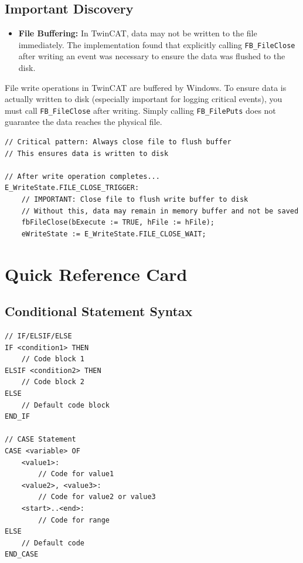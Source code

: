 \documentclass[11pt,a4paper]{article}
\begin{document}
\subsection{Important Discovery}

\begin{itemize}[leftmargin=*]
    \item \textbf{File Buffering:} In TwinCAT, data may not be written to the file immediately. The implementation found that explicitly calling \texttt{FB\_FileClose} after writing an event was necessary to ensure the data was flushed to the disk.
\end{itemize}

\begin{warningbox}
File write operations in TwinCAT are buffered by Windows. To ensure data is actually written to disk (especially important for logging critical events), you must call \texttt{FB\_FileClose} after writing. Simply calling \texttt{FB\_FilePuts} does not guarantee the data reaches the physical file.
\end{warningbox}

\begin{lstlisting}
// Critical pattern: Always close file to flush buffer
// This ensures data is written to disk

// After write operation completes...
E_WriteState.FILE_CLOSE_TRIGGER:
    // IMPORTANT: Close file to flush write buffer to disk
    // Without this, data may remain in memory buffer and not be saved
    fbFileClose(bExecute := TRUE, hFile := hFile);
    eWriteState := E_WriteState.FILE_CLOSE_WAIT;
\end{lstlisting}

\section*{Quick Reference Card}

\subsection*{Conditional Statement Syntax}

\begin{lstlisting}
// IF/ELSIF/ELSE
IF <condition1> THEN
    // Code block 1
ELSIF <condition2> THEN
    // Code block 2
ELSE
    // Default code block
END_IF

// CASE Statement
CASE <variable> OF
    <value1>:
        // Code for value1
    <value2>, <value3>:
        // Code for value2 or value3
    <start>..<end>:
        // Code for range
ELSE
    // Default code
END_CASE
\end{lstlisting}
\end{document}
